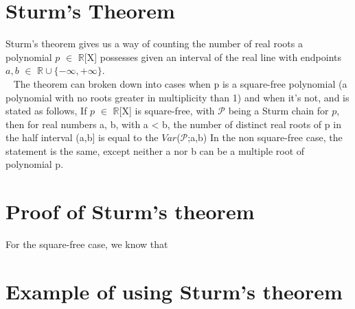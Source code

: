 \documentclass[a4paper]{article}
\begin{document}
\section{Sturm's Theorem}
Sturm's theorem gives us a way of counting the number of real roots a polynomial $p$ $\in$ $\mathbb{R}$[X] possesses given an interval of the real line with endpoints $a, b$ $\in$ $\mathbb{R} \cup\{-\infty, +\infty\}$.
\\~
The theorem can broken down into cases when p is a square-free polynomial (a polynomial with no roots greater in multiplicity than 1) and when it's not, and is stated as follows,
\newline \newline
If $p$ $\in$ $\mathbb{R}$[X] is square-free, with $\mathcal{P}$ being a Sturm chain for $p$, then for real numbers a, b, with a < b, the number of distinct real roots of p in the half interval (a,b] is equal to the $Var$($\mathcal{P}$;a,b)\newline
In the non square-free case, the statement is the same, except neither a nor b can be a multiple root of polynomial p.

\pagebreak

\section{Proof of Sturm's theorem}

For the square-free case, we know that

\section{Example of using Sturm's theorem}
\end{document}
